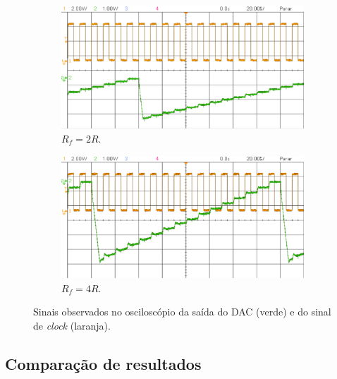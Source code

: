 \documentclass[a4paper, oneside]{article}
\begin{document}
\begin{figure}[ht]
	\centering
	\begin{subfigure}[b]{0.5\textwidth}
		\centering
		\includegraphics[width=\textwidth]{figures/2R_DAC_exp.png}
		\caption{$R_f=2R$.\\}
		\label{fig:2R_DAC_exp}
	\end{subfigure}%
	\hfill
	\begin{subfigure}[b]{0.5\textwidth}
		\centering
		\includegraphics[width=\textwidth]{figures/4R_DAC_exp.png}
		\caption{$R_f=4R$.\\}
		\label{fig:4R_DAC_exp}
	\end{subfigure}%
	\caption{Sinais observados no osciloscópio da saída do DAC (verde) e do sinal de \textit{clock} (laranja).\\}
	\label{fig:DAC_exp}
\end{figure}
 
\subsection{Comparação de resultados}\label{sec:cmpEstudoFunc}
\end{document}
